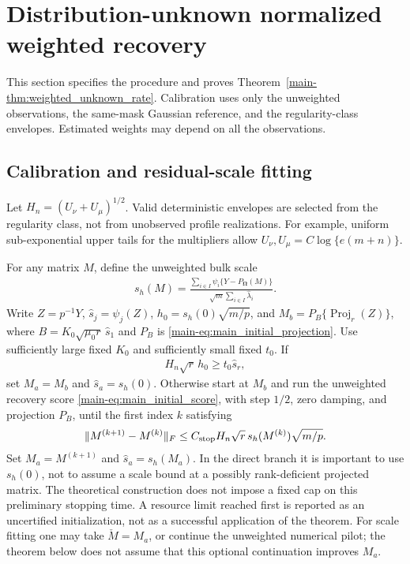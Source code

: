 \documentclass[numsec,webpdf,modern,large,namedate]{oup-authoring-template}
\theoremstyle{plain}
\theoremstyle{remark}
\newcommand{\bOmega}{\bm{\Omega}}
\newif\ifmarkchanges
\newenvironment{revision}{\begingroup\ifmarkchanges\color{red}\fi}{\endgroup}
\begin{document}
\begin{revision}
\section{Distribution-unknown normalized weighted recovery}
\label{sec:weighted_certification}
This section specifies the procedure and proves
Theorem~\ref{main-thm:weighted_unknown_rate}. Calibration uses only the
unweighted observations, the same-mask Gaussian reference, and the
regularity-class envelopes. Estimated weights may depend on all the
observations.

\subsection{Calibration and residual-scale fitting}
Let $H_n=(U_\nu+U_\mu)^{1/2}$. Valid deterministic envelopes are selected
from the regularity class, not from unobserved profile realizations.
For example, uniform sub-exponential upper tails for the multipliers
allow $U_\nu,U_\mu=C\log\{e(m+n)\}$.

For any matrix $M$, define the unweighted bulk scale
\begin{align*}
 s_h(M)=\frac{\sum_{i\in I}\psi_i\{Y-P_{\bOmega}(M)\}}
                  {\sqrt m\sum_{i\in I}\widehat\lambda_i}.
\end{align*}
Write $Z=p^{-1}Y$, $\widehat s_j=\psi_j(Z)$,
$h_0=s_h(0)\sqrt{m/p}$, and
$M_b=P_B\{\operatorname{Proj}_r(Z)\}$, where
$B=K_0\sqrt{\mu_0r}\,\widehat s_1$ and $P_B$ is
\eqref{main-eq:main_initial_projection}. Use sufficiently large fixed $K_0$ and
sufficiently small fixed $t_0$.
If
\begin{align}
 H_n\sqrt r\,h_0\ge t_0\widehat s_r,
 \label{eq:hetero_anchor_branch}
\end{align}
set $M_a=M_b$ and $\widehat s_a=s_h(0)$. Otherwise start at $M_b$ and
run the unweighted recovery score \eqref{main-eq:main_initial_score}, with
step $1/2$, zero damping, and projection $P_B$, until the first index $k$
satisfying
\begin{align}
 \|M^{(k+1)}-M^{(k)}\|_F
 \le C_{\rm stop}H_n\sqrt r\,s_h(M^{(k)})\sqrt{m/p}.
 \label{eq:hetero_anchor_stop}
\end{align}
Set $M_a=M^{(k+1)}$ and $\widehat s_a=s_h(M_a)$. In the direct branch it is
important to use $s_h(0)$, not to assume a scale bound at a possibly
rank-deficient projected matrix. The theoretical construction does not
impose a fixed cap on this preliminary stopping time. A resource limit
reached first is reported as an uncertified initialization, not as a
successful application of the theorem. For scale fitting one may take
$\check M=M_a$, or continue the unweighted numerical pilot; the theorem
below does not assume that this optional continuation improves $M_a$.



\end{revision}
\end{document}
